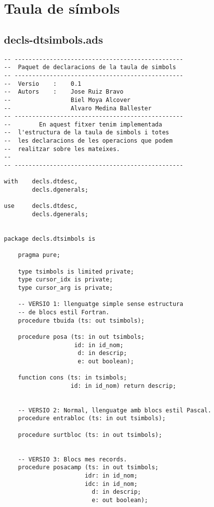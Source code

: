 \documentclass[10pt]{report}
\begin{document}
    \newpage
    
    
    \section{Taula de símbols}
    \subsection{decls-dtsimbols.ads}
    \begin{lstlisting}[style=Ada]
-- ------------------------------------------------
--  Paquet de declaracions de la taula de simbols
-- ------------------------------------------------
--  Versio    :    0.1
--  Autors    :    Jose Ruiz Bravo
--                 Biel Moya Alcover
--                 Alvaro Medina Ballester
-- ------------------------------------------------
--        En aquest fitxer tenim implementada
--  l'estructura de la taula de simbols i totes
--  les declaracions de les operacions que podem
--  realitzar sobre les mateixes.
--
-- ------------------------------------------------

with    decls.dtdesc,
        decls.dgenerals;
        
use     decls.dtdesc,
        decls.dgenerals;


package decls.dtsimbols is

    pragma pure;

    type tsimbols is limited private;
    type cursor_idx is private;
    type cursor_arg is private;
    
    -- VERSIO 1: llenguatge simple sense estructura 
    -- de blocs estil Fortran.
    procedure tbuida (ts: out tsimbols);
    
    procedure posa (ts: in out tsimbols;
                    id: in id_nom;
                     d: in descrip;
                     e: out boolean);
                     
    function cons (ts: in tsimbols;
                   id: in id_nom) return descrip;
             
                    
    -- VERSIO 2: Normal, llenguatge amb blocs estil Pascal.
    procedure entrabloc (ts: in out tsimbols);
    
    procedure surtbloc (ts: in out tsimbols);
    
    
    -- VERSIO 3: Blocs mes records.
    procedure posacamp (ts: in out tsimbols;
                       idr: in id_nom;
                       idc: in id_nom;
                         d: in descrip;
                         e: out boolean);
                        

\end{lstlisting}
\end{document}
